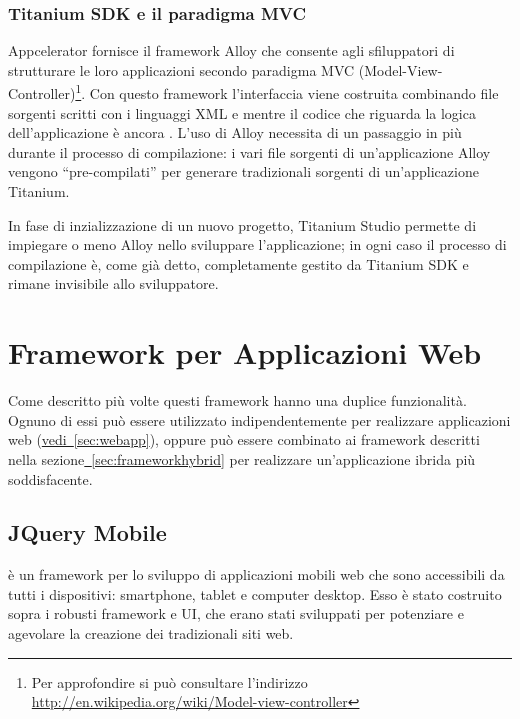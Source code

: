 			\subsubsection{Titanium SDK e il paradigma MVC}
				Appcelerator fornisce il framework Alloy che consente agli 
				sfiluppatori di strutturare le loro applicazioni secondo 
				paradigma MVC (Model-View-Controller)\footnote{Per approfondire 
				si può consultare l'indirizzo\\
				\url{http://en.wikipedia.org/wiki/Model-view-controller}}. Con 
				questo framework l'interfaccia viene costruita combinando file 
				sorgenti scritti con i linguaggi XML e \css{} mentre il codice che 
				riguarda la logica dell'applicazione è ancora \js{}. 
				L'uso di Alloy necessita di un passaggio in più durante il 
				processo di compilazione: i vari file sorgenti di 
				un'applicazione Alloy vengono ``pre-compilati'' per generare 
				tradizionali sorgenti \js{} di un'applicazione Titanium.
				
				In fase di inzializzazione di un nuovo progetto, Titanium Studio 
				permette di impiegare o meno Alloy nello sviluppare 
				l'applicazione; in ogni caso il processo di compilazione è, come 
				già detto, completamente gestito da Titanium SDK e rimane 
				invisibile allo	sviluppatore.
			
	\section{Framework per Applicazioni Web}	
	\label{sec:frameworkwebapp}
	
		Come descritto più volte questi framework hanno una duplice funzionalità.
		Ognuno di essi può essere utilizzato indipendentemente per realizzare
		applicazioni web (\hyperref[sec:webapp]{vedi~\ref{sec:webapp}}), oppure 
		può essere combinato ai framework descritti nella 
		sezione\hyperref[sec:frameworkhybrid]{~\ref{sec:frameworkhybrid}} per
		realizzare un'applicazione ibrida più soddisfacente.
		
		\subsection{JQuery Mobile}
		\label{subsec:jQuery}
			\jqm{} è un framework per lo sviluppo di applicazioni mobili
			web	che sono accessibili da tutti i dispositivi: smartphone, tablet
			e computer desktop. Esso è stato costruito sopra i robusti framework
			\jq{} e \jq{} UI, che erano stati sviluppati per potenziare e
			agevolare la creazione dei tradizionali siti web. 
			
